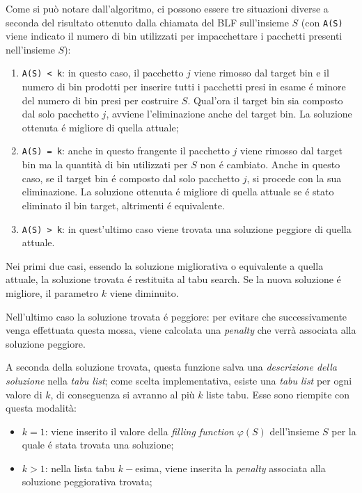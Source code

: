 Come si può notare dall'algoritmo, ci possono essere tre situazioni diverse a seconda del risultato ottenuto dalla chiamata del BLF sull'insieme $S$ (con \texttt{A(S)} viene indicato il numero di bin utilizzati per impacchettare i pacchetti presenti nell'insieme $S$):
\begin{enumerate}[noitemsep]
   \item \texttt{A(S) < k}: in questo caso, il pacchetto $j$ viene rimosso dal target bin e il numero di bin prodotti per inserire tutti i pacchetti presi in esame é minore del numero di bin presi per costruire $S$. Qual'ora il target bin sia composto dal solo pacchetto $j$, avviene l'eliminazione anche del target bin. La soluzione ottenuta é migliore di quella attuale;
   \item \texttt{A(S) = k}: anche in questo frangente il pacchetto $j$ viene rimosso dal target bin ma la quantità di bin utilizzati per $S$ non é cambiato. Anche in questo caso, se il target bin é composto dal solo pacchetto $j$, si procede con la sua eliminazione. La soluzione ottenuta é migliore di quella attuale se é stato eliminato il bin target, altrimenti é equivalente.
   \item \texttt{A(S) > k}: in quest'ultimo caso viene trovata una soluzione peggiore di quella attuale.
\end{enumerate}

Nei primi due casi, essendo la soluzione migliorativa o equivalente a quella attuale, la soluzione trovata é restituita al tabu search. Se la nuova soluzione é migliore, il parametro $k$ viene diminuito.

Nell'ultimo caso la soluzione trovata é peggiore: per evitare che successivamente venga effettuata questa mossa, viene calcolata una \textit{penalty} che verrà associata alla soluzione peggiore.

A seconda della soluzione trovata, questa funzione salva una \textit{descrizione della soluzione} nella \textit{tabu list}; come scelta implementativa, esiste una \textit{tabu list} per ogni valore di $k$, di conseguenza si avranno al più $k$ liste tabu. Esse sono riempite con questa modalità:
\begin{itemize}[noitemsep]
   \item \textit{$k=1$}: viene inserito il valore della \textit{filling function} $\varphi(S)$ dell'ìnsieme $S$ per la quale é stata trovata una soluzione;
   \item \textit{$k>1$}: nella lista tabu $k-$esima, viene inserita la \textit{penalty} associata alla soluzione peggiorativa trovata;
\end{itemize}

